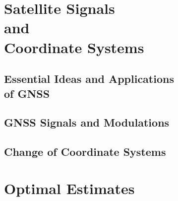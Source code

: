 \documentclass[a4paper,12pt]{book}
\begin{document}
\lstset{
	numbers=left,
	numberstyle=\tiny,
	tabsize=1,
	frame=shadowbox
	} %


\part{Satellite Signals \\and\\ Coordinate Systems}
	\chapter{Essential Ideas and Applications \\ of GNSS}
	\minitoc %
	\newpage%
		
		
		


	\chapter{GNSS Signals and Modulations}
	\minitoc %
	\newpage%
		
		
	

	\chapter{Change of Coordinate Systems}
	\minitoc %
	\newpage%
		
		
		
		
		
		
	


\part{Optimal Estimates}
\end{document}
